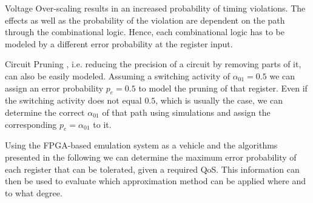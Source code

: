 \documentclass[conference]{IEEEtran}
\begin{document}
\begin{LaTeXdescription}
\item[Voltage Over-scaling] results in an increased probability of timing violations. The effects as well as the probability of the violation are dependent on the path through the combinational logic. Hence, each combinational logic has to be modeled by a different error probability at the register input.
\item[Circuit Pruning], i.e. reducing the precision of a circuit by removing parts of it, can also be easily modeled. Assuming a switching activity of $\alpha_{01}=0.5$ we can assign an error probability $p_e=0.5$ to model the pruning of that register. Even if the switching activity does not equal $0.5$, which is usually the case, we can determine the correct $\alpha_{01}$ of that path using simulations and assign the corresponding $p_e=\alpha_{01}$ to it.
\end{LaTeXdescription}
Using the FPGA-based emulation system as a vehicle and the algorithms presented in the following we can determine the maximum error probability of each register that can be tolerated, given a required QoS. This information can then be used to evaluate which approximation method can be applied where and to what degree.
\end{document}
